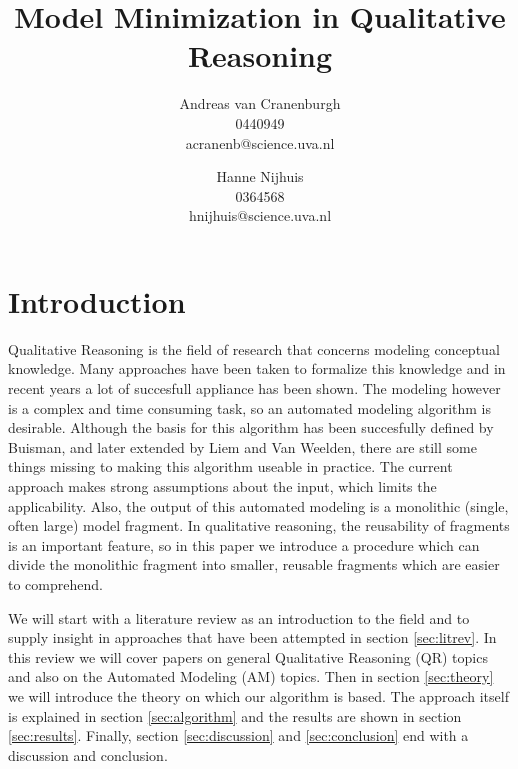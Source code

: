 \documentclass{article} %
\title{Model Minimization in Qualitative Reasoning}
\author{Andreas van Cranenburgh \\ 0440949 \\ acranenb@science.uva.nl 
\and Hanne Nijhuis \\ 0364568 \\ hnijhuis@science.uva.nl}
\begin{document}
\maketitle


\vspace{15em}


\newpage

\tableofcontents

\newpage

\section{Introduction}
Qualitative Reasoning is the field of research that concerns modeling conceptual
knowledge. Many approaches have been taken to formalize this knowledge and in
recent years a lot of succesfull appliance has been shown. The modeling however
is a complex and time consuming task, so an automated modeling algorithm is
desirable. Although the basis for this algorithm has been succesfully defined
by Buisman, and later extended by Liem and Van Weelden, there are still some
things missing to making this algorithm useable in practice. The current
approach makes strong assumptions about the input, which limits the
applicability. Also, the output of this automated modeling is a monolithic
(single, often large) model fragment. In qualitative reasoning, the reusability
of fragments is an important feature, so in this paper we introduce a
procedure which can divide the monolithic fragment into smaller, reusable
fragments which are easier to comprehend.

We will start with a literature review as an introduction to the field and to
supply insight in approaches that have been attempted in section
\ref{sec:litrev}. In this review we will cover papers on general Qualitative
Reasoning (QR) topics and also on the Automated Modeling (AM) topics.
Then in section \ref{sec:theory} we will introduce the theory on which our
algorithm is based. The approach itself is explained in section
\ref{sec:algorithm} and the results are shown in section \ref{sec:results}.
Finally, section \ref{sec:discussion} and \ref{sec:conclusion} end with a
discussion and conclusion.
\end{document}
